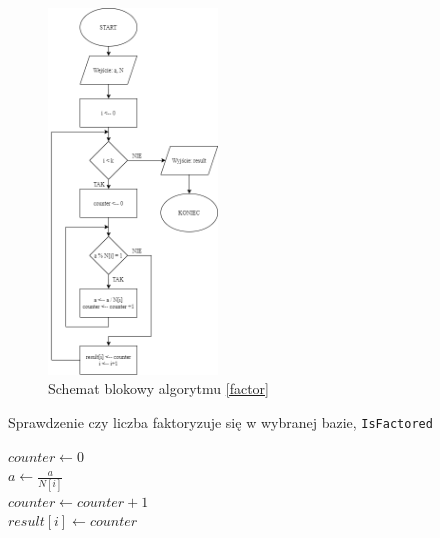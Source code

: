 \documentclass[]{article}
\begin{document}
		\begin{figure}[H]
			\begin{center}
				\includegraphics[width=4.5cm]{alg 4.png} \caption{Schemat blokowy algorytmu \ref{factor}}
			\end{center}
		\end{figure}
	
		\begin{algorithm}[H]
			\SetAlgoLined
			\caption{Sprawdzenie czy liczba faktoryzuje się w wybranej bazie, \texttt{IsFactored}}
			\label{factor_alt}
			{
				\(counter \gets 0\) \\
				{
					\(a \gets \frac{a}{N[i]}\) \\
					\(counter \gets counter + 1\) \\
				}
				\(result[i] \gets counter\) \\
			}
			{
			}
			\Else
			{
			}
			
		\end{algorithm}
	
\end{document}
